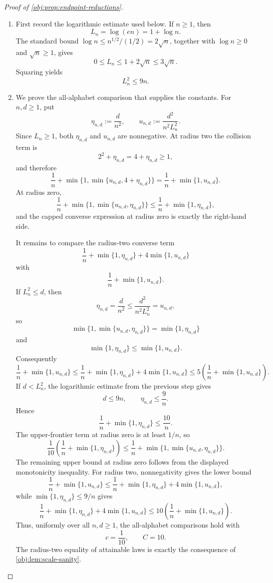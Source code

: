 \begin{proof}[Proof of \cref{obj:prop:endpoint-reductions}]
\begin{enumerate}
\item First record the logarithmic estimate used below.  If \(n\ge1\), then
\[
L_n=\log(en)=1+\log n .
\]
The standard bound \(\log n\le n^{1/2}/(1/2)=2\sqrt n\), together with
\(\log n\ge0\) and \(\sqrt n\ge1\), gives
\[
0\le L_n\le 1+2\sqrt n\le 3\sqrt n .
\]
Squaring yields
\[
L_n^2\le 9n .
\]

\item We prove the all-alphabet comparison that supplies the constants.  For \(n,d\ge1\), put
\[
\eta_{n,d}:=\frac{d}{n^2},
\qquad
u_{n,d}:=\frac{d^2}{n^2L_n^2}.
\]
Since \(L_n\ge1\), both \(\eta_{n,d}\) and \(u_{n,d}\) are nonnegative.  At radius two the collision term is
\[
2^2+\eta_{n,d}=4+\eta_{n,d}\ge1,
\]
and therefore
\[
\frac1n+\min\{1,\min\{u_{n,d},4+\eta_{n,d}\}\}
=
\frac1n+\min\{1,u_{n,d}\}.
\]
At radius zero,
\[
\frac1n+\min\{1,\min\{u_{n,d},\eta_{n,d}\}\}
\le
\frac1n+\min\{1,\eta_{n,d}\},
\]
and the capped converse expression at radius zero is exactly the right-hand side.

It remains to compare the radius-two converse term
\[
\frac1n+\min\{1,\eta_{n,d}\}+4\min\{1,u_{n,d}\}
\]
with
\[
\frac1n+\min\{1,u_{n,d}\}.
\]
If \(L_n^2\le d\), then
\[
\eta_{n,d}=\frac d{n^2}\le \frac{d^2}{n^2L_n^2}=u_{n,d},
\]
so
\[
\min\{1,\min\{u_{n,d},\eta_{n,d}\}\}=\min\{1,\eta_{n,d}\}
\]
and
\[
\min\{1,\eta_{n,d}\}\le \min\{1,u_{n,d}\}.
\]
Consequently
\[
\frac1n+\min\{1,u_{n,d}\}
\le
\frac1n+\min\{1,\eta_{n,d}\}+4\min\{1,u_{n,d}\}
\le
5\left(\frac1n+\min\{1,u_{n,d}\}\right).
\]
If \(d<L_n^2\), the logarithmic estimate from the previous step gives
\[
d\le 9n,
\qquad
\eta_{n,d}\le \frac9n .
\]
Hence
\[
\frac1n+\min\{1,\eta_{n,d}\}\le \frac{10}{n}.
\]
The upper-frontier term at radius zero is at least \(1/n\), so
\[
\frac1{10}\left(\frac1n+\min\{1,\eta_{n,d}\}\right)
\le
\frac1n+\min\{1,\min\{u_{n,d},\eta_{n,d}\}\}.
\]
The remaining upper bound at radius zero follows from the displayed monotonicity inequality.  For radius two, nonnegativity gives the lower bound
\[
\frac1n+\min\{1,u_{n,d}\}
\le
\frac1n+\min\{1,\eta_{n,d}\}+4\min\{1,u_{n,d}\},
\]
while \(\min\{1,\eta_{n,d}\}\le 9/n\) gives
\[
\frac1n+\min\{1,\eta_{n,d}\}+4\min\{1,u_{n,d}\}
\le
10\left(\frac1n+\min\{1,u_{n,d}\}\right).
\]
Thus, uniformly over all \(n,d\ge1\), the all-alphabet comparisons hold with
\[
c=\frac1{10},
\qquad
C=10 .
\]
The radius-two equality of attainable laws is exactly the consequence of \cref{obj:lem:scale-sanity}.


\end{enumerate}
\end{proof}
